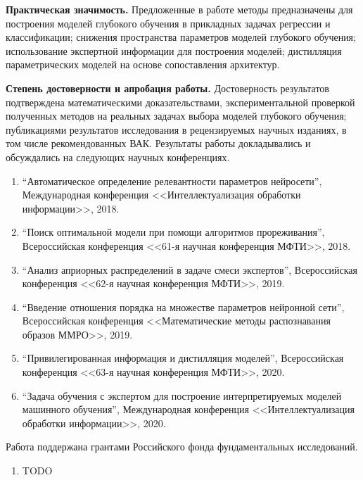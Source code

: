 \vspace{0.5cm}
\textbf{Практическая значимость.} Предложенные в работе методы предназначены для построения моделей глубокого обучения в прикладных задачах регрессии и классификации; снижения пространства параметров моделей глубокого обучения; использование экспертной информации для построения моделей; дистилляция параметрических моделей на основе сопоставления архитектур.

\vspace{0.5cm}
\textbf{Степень достоверности и апробация работы.} Достоверность результатов подтверждена математическими доказательствами, экспериментальной проверкой полученных методов на реальных задачах выбора моделей глубокого обучения; публикациями результатов исследования в рецензируемых научных изданиях, в том числе рекомендованных ВАК. Результаты работы докладывались и обсуждались на следующих научных конференциях.
\begin{enumerate}
    \item ``Автоматическое определение релевантности параметров нейросети'', Международная конференция <<Интеллектуализация обработки информации>>, 2018.
    \item ``Поиск оптимальной модели при помощи алгоритмов прореживания'', Всероссийская конференция <<61-я научная конференция МФТИ>>, 2018.
    \item ``Анализ априорных распределений в задаче смеси экспертов'', Всероссийская конференция <<62-я научная конференция МФТИ>>, 2019.
    \item ``Введение отношения порядка на множестве параметров нейронной сети'', Всероссийская конференция <<Математические методы распознавания образов ММРО>>, 2019.
    \item ``Привилегированная информация и дистилляция моделей'', Всероссийская конференция <<63-я научная конференция МФТИ>>, 2020.
    \item ``Задача обучения с экспертом для построение интерпретируемых моделей машинного обучения'', Международная конференция <<Интеллектуализация обработки информации>>, 2020.
\end{enumerate}

Работа поддержана грантами Российского фонда фундаментальных исследований.
\begin{enumerate}
    \item TODO
\end{enumerate}

